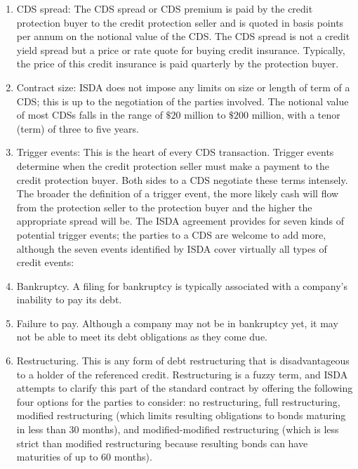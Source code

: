 \documentclass[11pt]{article}
\begin{document}
\begin{enumerate}
  \item CDS spread: The CDS spread or CDS premium is paid by the credit protection buyer to the credit protection seller and is quoted in basis points per annum on the notional value of the CDS. The CDS spread is not a credit yield spread but a price or rate quote for buying credit insurance. Typically, the price of this credit insurance is paid quarterly by the protection buyer.

  \item Contract size: ISDA does not impose any limits on size or length of term of a CDS; this is up to the negotiation of the parties involved. The notional value of most CDSs falls in the range of $\$ 20$ million to $\$ 200$ million, with a tenor (term) of three to five years.

  \item Trigger events: This is the heart of every CDS transaction. Trigger events determine when the credit protection seller must make a payment to the credit protection buyer. Both sides to a CDS negotiate these terms intensely. The broader the definition of a trigger event, the more likely cash will flow from the protection seller to the protection buyer and the higher the appropriate spread will be. The ISDA agreement provides for seven kinds of potential trigger events; the parties to a CDS are welcome to add more, although the seven events identified by ISDA cover virtually all types of credit events:

  \item Bankruptcy. A filing for bankruptcy is typically associated with a company's inability to pay its debt.

  \item Failure to pay. Although a company may not be in bankruptcy yet, it may not be able to meet its debt obligations as they come due.

  \item Restructuring. This is any form of debt restructuring that is disadvantageous to a holder of the referenced credit. Restructuring is a fuzzy term, and ISDA attempts to clarify this part of the standard contract by offering the following four options for the parties to consider: no restructuring, full restructuring, modified restructuring (which limits resulting obligations to bonds maturing in less than 30 months), and modified-modified restructuring (which is less strict than modified restructuring because resulting bonds can have maturities of up to 60 months).


\end{enumerate}
\end{document}
